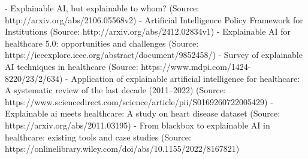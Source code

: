 \documentclass{article}%
\begin{document}
{-} Explainable AI, but explainable to whom? (Source: http://arxiv.org/abs/2106.05568v2)\newline%
{-} Artificial Intelligence Policy Framework for Institutions (Source: http://arxiv.org/abs/2412.02834v1)\newline%
{-} Explainable AI for healthcare 5.0: opportunities and challenges (Source: https://ieeexplore.ieee.org/abstract/document/9852458/)\newline%
{-} Survey of explainable AI techniques in healthcare (Source: https://www.mdpi.com/1424{-}8220/23/2/634)\newline%
{-} Application of explainable artificial intelligence for healthcare: A systematic review of the last decade (2011–2022) (Source: https://www.sciencedirect.com/science/article/pii/S0169260722005429)\newline%
{-} Explainable ai meets healthcare: A study on heart disease dataset (Source: https://arxiv.org/abs/2011.03195)\newline%
{-} From blackbox to explainable AI in healthcare: existing tools and case studies (Source: https://onlinelibrary.wiley.com/doi/abs/10.1155/2022/8167821)%
\end{document}
